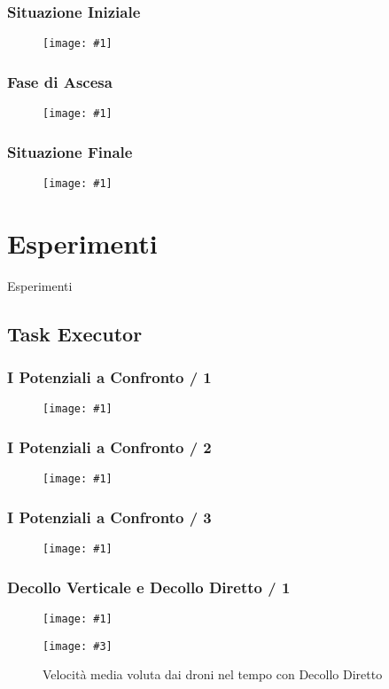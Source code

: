 \documentclass{beamer}
\newcommand{\putimage}[2] {
  \begin{figure}[H]
    \centering
    \texttt{[image: \#1]}
	\end{figure}
}
\newcommand{\putimagecouple}[4] {
  \begin{figure}[!htb]
    \centering
    \begin{minipage}{0.45\linewidth}
      \centering
      \texttt{[image: \#1]}
      \caption{#2}
    \end{minipage}
    \hspace{0.25cm}
    \begin{minipage}{0.45\linewidth}
      \centering
      \texttt{[image: \#3]}
      \caption{#4}
    \end{minipage}
  \end{figure}
}
\begin{document}
\begin{frame}
\frametitle{Situazione Iniziale}
\putimage{images/esempio/iterazione\_zero\_left.png}{0.85}
\end{frame}

\begin{frame}
\frametitle{Fase di Ascesa}
\putimage{images/esempio/iterazione\_venti\_left.png}{0.85}
\end{frame}

\begin{frame}
\frametitle{Situazione Finale}
\putimage{images/esempio/iterazione\_finale\_top.png}{0.85}
\end{frame}

\section{Esperimenti}
\begin{frame}
\centering
\Huge
Esperimenti
\end{frame}

\subsection{Task Executor}

\begin{frame}
\frametitle{I Potenziali a Confronto / 1}
  \putimage{images/slides/task-executor-noiseless-vertical/MeanDistanceFromTarget.png}{0.66}
\end{frame}

\begin{frame}
\frametitle{I Potenziali a Confronto / 2}
\putimage{images/slides/task-executor-noiseless-vertical/MeanDistancesWithinSquadron.png}{0.66}
\end{frame}

\begin{frame}
\frametitle{I Potenziali a Confronto / 3}
\putimage{images/slides/task-executor-noiseless-vertical/MinDistancesGlobally.png}{0.66}
\end{frame}

\begin{frame}
\frametitle{Decollo Verticale e Decollo Diretto / 1}
\putimagecouple{images/slides/task-executor-noiseless-vertical/MeanSpeed.png}{Velocit\`a media voluta dai droni nel tempo con Decollo Verticale}
               {images/slides/task-executor-noiseless-direct/MeanSpeed.png}{Velocit\`a media voluta dai droni nel tempo con Decollo Diretto}
\end{frame}
\end{document}
